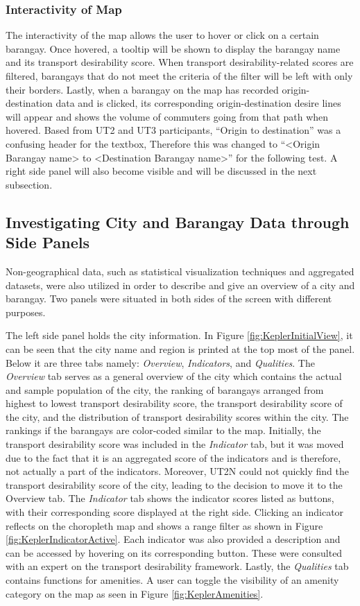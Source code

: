 \documentclass{sigchi}
\begin{document}
\subsubsection{Interactivity of Map}
The interactivity of the map allows the user to hover or click on a certain barangay. Once hovered, a tooltip will be shown to display the barangay name and its transport desirability score. When transport desirability-related scores are filtered, barangays that do not meet the criteria of the filter will be left with only their borders.  Lastly, when a barangay on the map has recorded origin-destination data and is clicked, its corresponding origin-destination desire lines will appear and shows the volume of commuters going from that path when hovered. Based from UT2 and UT3 participants, “Origin to destination” was a confusing header for the textbox, Therefore this was changed to “<Origin Barangay name> to <Destination Barangay name>” for the following test. A right side panel will also become visible and will be discussed in the next subsection.

\subsection{Investigating City and Barangay Data through Side Panels}
Non-geographical data, such as statistical visualization techniques and aggregated datasets, were also utilized in order to describe and give an overview of a city and barangay. Two panels were situated in both sides of the screen with different purposes.

The left side panel holds the city information. In Figure \ref{fig:KeplerInitialView}, it can be seen that the city name and region is printed at the top most of the panel. Below it are three tabs namely: \textit{Overview}, \textit{Indicators}, and \textit{Qualities}. The \textit{Overview} tab serves as a general overview of the city which contains the actual and sample population of the city, the ranking of barangays arranged from highest to lowest transport desirability score, the transport desirability score of the city, and the distribution of transport desirability scores within the city. The rankings if the barangays are color-coded similar to the map. Initially, the transport desirability score was included in the \textit{Indicator} tab, but it was moved due to the fact that it is an aggregated score of the indicators and is therefore, not actually a part of the indicators. Moreover, UT2N could not quickly find the transport desirability score of the city, leading to the decision to move it to the Overview tab. The \textit{Indicator} tab shows the indicator scores listed as buttons, with their corresponding score displayed at the right side. Clicking an indicator reflects on the choropleth map and shows a range filter as shown in Figure \ref{fig:KeplerIndicatorActive}. Each indicator was also provided a description and can be accessed by hovering on its corresponding button. These  were consulted with an expert on the transport desirability framework. Lastly, the \textit{Qualities} tab contains functions for amenities. A user can toggle the visibility of an amenity category on the map as seen in Figure \ref{fig:KeplerAmenities}.
\end{document}
